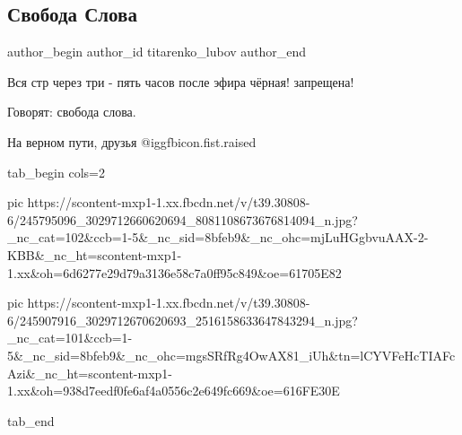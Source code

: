  
 
 
 
 
 
\subsection{Свобода Слова}
\label{sec:15_10_2021.fb.titarenko_lubov.1.svoboda_slova}
 
\ifcmt
 author_begin
   author_id titarenko_lubov
 author_end
\fi

Вся стр  через три - пять часов  после эфира  чёрная! запрещена! 

Говорят: свобода слова.

На верном пути, друзья @igg{fbicon.fist.raised} 

\ifcmt
  tab_begin cols=2

     pic https://scontent-mxp1-1.xx.fbcdn.net/v/t39.30808-6/245795096_3029712660620694_8081108673676814094_n.jpg?_nc_cat=102&ccb=1-5&_nc_sid=8bfeb9&_nc_ohc=mjLuHGgbvuAAX-2-KBB&_nc_ht=scontent-mxp1-1.xx&oh=6d6277e29d79a3136e58c7a0ff95c849&oe=61705E82

     pic https://scontent-mxp1-1.xx.fbcdn.net/v/t39.30808-6/245907916_3029712670620693_2516158633647843294_n.jpg?_nc_cat=101&ccb=1-5&_nc_sid=8bfeb9&_nc_ohc=mgsSRfRg4OwAX81_iUh&tn=lCYVFeHcTIAFcAzi&_nc_ht=scontent-mxp1-1.xx&oh=938d7eedf0fe6af4a0556c2e649fc669&oe=616FE30E

  tab_end
\fi

